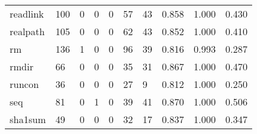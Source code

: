 \begin{longtable}{lp{1.3cm}p{1.3cm}p{1.3cm}p{1.3cm}p{1.3cm}p{1.3cm}p{1.3cm}p{1.3cm}p{1.3cm}}
readlink  &                    100 &                                             0 &                                            0 &                                           0 &                                           57 &                                         43 &                                0.858 &                                  1.000 &                                0.430 \\
realpath  &                    105 &                                             0 &                                            0 &                                           0 &                                           62 &                                         43 &                                0.852 &                                  1.000 &                                0.410 \\
rm        &                    136 &                                             1 &                                            0 &                                           0 &                                           96 &                                         39 &                                0.816 &                                  0.993 &                                0.287 \\
rmdir     &                     66 &                                             0 &                                            0 &                                           0 &                                           35 &                                         31 &                                0.867 &                                  1.000 &                                0.470 \\
runcon    &                     36 &                                             0 &                                            0 &                                           0 &                                           27 &                                          9 &                                0.812 &                                  1.000 &                                0.250 \\
seq       &                     81 &                                             0 &                                            1 &                                           0 &                                           39 &                                         41 &                                0.870 &                                  1.000 &                                0.506 \\
sha1sum   &                     49 &                                             0 &                                            0 &                                           0 &                                           32 &                                         17 &                                0.837 &                                  1.000 &                                0.347 \\

\end{longtable}
